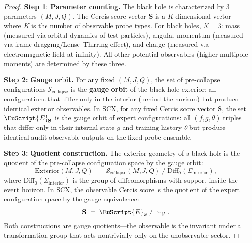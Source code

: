 \documentclass[12pt,a4paper]{article}
\theoremstyle{remark}
\newcommand{\G}{\mathcal{G}}
\newcommand{\Sg}{\mathcal{S}}
\newcommand{\ExpertSet}{\EuScript{E}}
\newcommand{\SCX}{\textsf{SCX}}
\newcommand{\Cercis}{\textsf{Cercis}}
\begin{document}
\begin{proof}
\noindent\textbf{Step 1: Parameter counting.}
The black hole is characterized by 3 parameters $(M, J, Q)$. The \Cercis{} score vector $\mathbf{S}$ is a $K$-dimensional vector where $K$ is the number of observable probe types. For black holes, $K = 3$: mass (measured via orbital dynamics of test particles), angular momentum (measured via frame-dragging/Lense--Thirring effect), and charge (measured via electromagnetic field at infinity). All other potential observables (higher multipole moments) are determined by these three.

\smallskip
\noindent\textbf{Step 2: Gauge orbit.}
For any fixed $(M, J, Q)$, the set of pre-collapse configurations $\Sg_{\text{collapse}}$ is the \textbf{gauge orbit} of the black hole exterior: all configurations that differ only in the interior (behind the horizon) but produce identical exterior observables. In \SCX{}, for any fixed \Cercis{} score vector $\mathbf{S}$, the set $\ExpertSet_{\mathbf{S}}$ is the gauge orbit of expert configurations: all $(f, g, \theta)$ triples that differ only in their internal state $g$ and training history $\theta$ but produce identical audit-observable outputs on the fixed probe ensemble.

\smallskip
\noindent\textbf{Step 3: Quotient construction.}
The exterior geometry of a black hole is the quotient of the pre-collapse configuration space by the gauge orbit:
\begin{equation}
  \text{Exterior}(M, J, Q) \;=\; \Sg_{\text{collapse}}(M, J, Q) \;/\; \text{Diff}_0(\Sigma_{\text{interior}}),
\end{equation}
where $\text{Diff}_0(\Sigma_{\text{interior}})$ is the group of diffeomorphisms with support inside the event horizon. In \SCX{}, the observable \Cercis{} score is the quotient of the expert configuration space by the gauge equivalence:
\begin{equation}
  \mathbf{S} \;=\; \ExpertSet_{\mathbf{S}} \;/\; \sim_{\G}.
\end{equation}
Both constructions are gauge quotients---the observable is the invariant under a transformation group that acts nontrivially only on the unobservable sector.


\end{proof}
\end{document}
